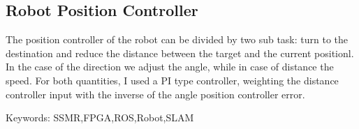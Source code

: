 \begin{titlepage}
\subsection*{Robot Position Controller}

The position controller of the robot can be divided by two sub task: turn to the destination and reduce the distance between the target and the current positionl. In the case of the direction we adjust the angle, while in case of distance the speed. For both quantities, I used a PI type controller, weighting the distance controller input with the inverse of the angle position controller error.

Keywords: SSMR,FPGA,ROS,Robot,SLAM

\end{titlepage}



